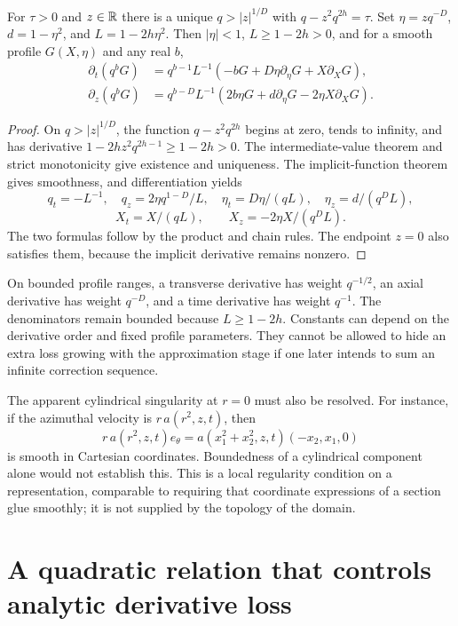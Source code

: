\begin{proposition}
\label{prop:ns-similarity-chain-rule}
For $\tau>0$ and $z\in\mathbb{R}$ there is a unique
$q>|z|^{1/D}$ with $q-z^2q^{2h}=\tau$. Set $\eta=zq^{-D}$,
$d=1-\eta^2$, and $L=1-2h\eta^2$. Then $|\eta|<1$, $L\geq1-2h>0$,
and for a smooth profile $G(X,\eta)$ and any real $b$,
\begin{align*}
 \partial_t(q^bG)&=q^{b-1}L^{-1}
     (-bG+D\eta\partial_\eta G+X\partial_XG),\\
 \partial_z(q^bG)&=q^{b-D}L^{-1}
     (2b\eta G+d\partial_\eta G-2\eta X\partial_XG).
\end{align*}
\end{proposition}
\begin{proof}
On $q>|z|^{1/D}$, the function $q-z^2q^{2h}$ begins at zero,
tends to infinity, and has derivative
$1-2hz^2q^{2h-1}\geq1-2h>0$. The intermediate-value theorem and strict
monotonicity give existence and uniqueness. The implicit-function theorem
gives smoothness, and differentiation yields
\[
 q_t=-L^{-1},\quad q_z=2\eta q^{1-D}/L,\quad
 \eta_t=D\eta/(qL),\quad\eta_z=d/(q^DL),
\]
\[
 X_t=X/(qL),\qquad X_z=-2\eta X/(q^DL).
\]
The two formulas follow by the product and chain rules. The endpoint $z=0$
also satisfies them, because the implicit derivative remains nonzero.
\end{proof}

On bounded profile ranges, a transverse derivative has weight $q^{-1/2}$,
an axial derivative has weight $q^{-D}$, and a time derivative has weight
$q^{-1}$. The denominators remain bounded because $L\geq1-2h$.
Constants can depend on the derivative order and fixed profile parameters.
They cannot be allowed to hide an extra loss growing with the approximation
stage if one later intends to sum an infinite correction sequence.

The apparent cylindrical singularity at $r=0$ must also be resolved.
For instance, if the azimuthal velocity is $r\,a(r^2,z,t)$, then
\[
 r\,a(r^2,z,t)e_\theta
   =a(x_1^2+x_2^2,z,t)(-x_2,x_1,0)
\]
is smooth in Cartesian coordinates. Boundedness of a cylindrical component
alone would not establish this. This is a local regularity condition on a
representation, comparable to requiring that coordinate expressions of a
section glue smoothly; it is not supplied by the topology of the domain.

\section{A quadratic relation that controls analytic derivative loss}

